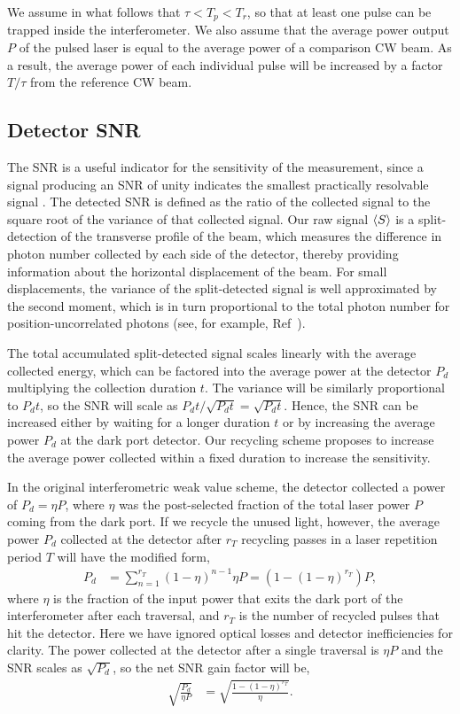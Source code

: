 We assume in what follows that $\tau < T_p < T_r$, so that at least one pulse can be trapped inside the interferometer.  We also assume that the average power output $P$ of the pulsed laser is equal to the average power of a comparison CW beam.  As a result, the average power of each individual pulse will be increased by a factor $T/\tau$ from the reference CW beam.

\subsection{Detector SNR}\label{sec:snr}
The SNR is a useful indicator for the sensitivity of the measurement, since a signal producing an SNR of unity indicates the smallest practically resolvable signal \cite{Barnett2003}.  The detected SNR is defined as the ratio of the collected signal to the square root of the variance of that collected signal.  Our raw signal $\left\langle S \right\rangle$ is a split-detection of the transverse profile of the beam, which measures the difference in photon number collected by each side of the detector, thereby providing information about the horizontal displacement of the beam.  For small displacements, the variance of the split-detected signal is well approximated by the second moment, which is in turn proportional to the total photon number for position-uncorrelated photons (see, for example, Ref~\cite{Barnett2003}).

The total accumulated split-detected signal scales linearly with the average collected energy, which can be factored into the average power at the detector $P_d$ multiplying the collection duration $t$.  The variance will be similarly proportional to $P_d t$, so the SNR will scale as $P_dt/\sqrt{P_dt} = \sqrt{P_dt}$.  Hence, the SNR can be increased either by waiting for a longer duration $t$ or by increasing the average power $P_d$ at the dark port detector.  Our recycling scheme proposes to increase the average power collected within a fixed duration to increase the sensitivity.  

In the original interferometric weak value scheme, the detector collected a power of $P_d= \eta P$, where $\eta$ was the post-selected fraction of the total laser power $P$ coming from the dark port. If we recycle the unused light, however, the average power $P_d$ collected at the detector after $r_T$ recycling passes in a laser repetition period $T$ will have the modified form, 
\begin{align}\label{eq:power}
  P_d &= \sum_{n=1}^{r_T} (1-\eta)^{n-1} \eta P = (1-(1-\eta)^{r_T}) P,
\end{align}
where $\eta$ is the fraction of the input power that exits the dark port of the interferometer after each traversal, and $r_T$ is the number of recycled pulses that hit the detector.  Here we have ignored optical losses and detector inefficiencies for clarity.  The power collected at the detector after a single traversal is $\eta P$ and the SNR scales as $\sqrt{P_d}$, so the net SNR gain factor will be,
\begin{align}\label{eq:powergain}
  \sqrt{\frac{P_d}{\eta P}} &= \sqrt{\frac{1 - (1-\eta)^{r_T}}{\eta}}.
\end{align}

